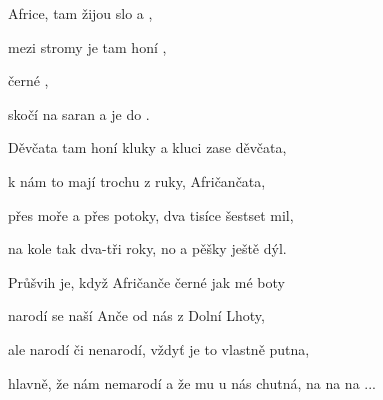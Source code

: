 
\zs

 Africe, tam žijou slo a  ,


mezi stromy je tam honí ,


    černé ,


 skočí na saran a je do .    

\ks
\zs

Děvčata tam honí kluky a kluci zase děvčata,

k nám to mají trochu z ruky, Afričančata,

přes moře a přes potoky, dva tisíce šestset mil,

na kole tak dva-tři roky, no a pěšky ještě dýl.

\ks
\zs

Průšvih je, když Afričanče černé jak mé boty

narodí se naší Anče od nás z Dolní Lhoty,

ale narodí či nenarodí, vždyť je to vlastně putna,

hlavně, že nám nemarodí a že mu u nás chutná, na na na ...

\ks

\kp





